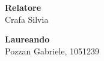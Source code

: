 \documentclass{article}
\begin{document}
\begin{titlepage}
\begin{center}
\vspace{30pt}

\begin{large}
\begin{flushleft}
\textbf{Relatore}\\
\vspace{5pt}
Crafa Silvia
\end{flushleft}

\vspace{0pt}

\begin{flushright}
\textbf{Laureando}\\
\vspace{5pt}
Pozzan Gabriele, 1051239
\end{flushright}
\end{large}

\end{center}
\end{titlepage}
\end{document}
